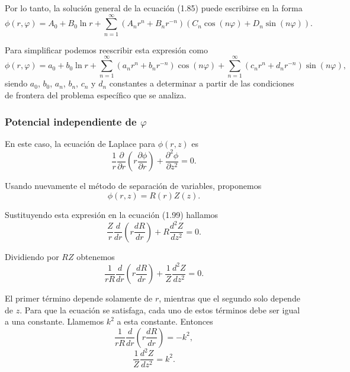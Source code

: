 \documentclass[12pt,a4paper]{book}
\begin{document}
Por lo tanto, la solución general de la ecuación (1.85) puede escribirse en la forma
\begin{equation}
\phi(r, \varphi) = A_0 + B_0\ln r + \sum_{n=1}^{\infty}\left(A_n r^n + B_n r^{-n}\right)\left(C_n\cos(n\varphi) + D_n\sin(n\varphi)\right).
\end{equation}

Para simplificar podemos reescribir esta expresión como
\begin{equation}
\phi(r, \varphi) = a_0 + b_0\ln r + \sum_{n=1}^{\infty}\left(a_n r^n + b_n r^{-n}\right)\cos(n\varphi) + \sum_{n=1}^{\infty}\left(c_n r^n + d_n r^{-n}\right)\sin(n\varphi),
\end{equation}
siendo $a_0$, $b_0$, $a_n$, $b_n$, $c_n$ y $d_n$ constantes a determinar a partir de las condiciones de frontera del problema específico que se analiza.

\subsubsection{Potencial independiente de $\varphi$}

En este caso, la ecuación de Laplace para $\phi(r, z)$ es
\begin{equation}
\frac{1}{r}\frac{\partial}{\partial r}\left(r\frac{\partial \phi}{\partial r}\right) + \frac{\partial^2\phi}{\partial z^2} = 0.
\end{equation}

Usando nuevamente el método de separación de variables, proponemos
\begin{equation}
\phi(r, z) = R(r)Z(z).
\end{equation}

Sustituyendo esta expresión en la ecuación (1.99) hallamos
\begin{equation}
\frac{Z}{r}\frac{d}{dr}\left(r\frac{dR}{dr}\right) + R\frac{d^2Z}{dz^2} = 0.
\end{equation}

Dividiendo por $RZ$ obtenemos
\begin{equation}
\frac{1}{rR}\frac{d}{dr}\left(r\frac{dR}{dr}\right) + \frac{1}{Z}\frac{d^2Z}{dz^2} = 0.
\end{equation}

El primer término depende solamente de $r$, mientras que el segundo solo depende de $z$. Para que la ecuación se satisfaga, cada uno de estos términos debe ser igual a una constante. Llamemos $k^2$ a esta constante. Entonces
\begin{equation}
\frac{1}{rR}\frac{d}{dr}\left(r\frac{dR}{dr}\right) = -k^2,
\end{equation}
\begin{equation}
\frac{1}{Z}\frac{d^2Z}{dz^2} = k^2.
\end{equation}
\end{document}
